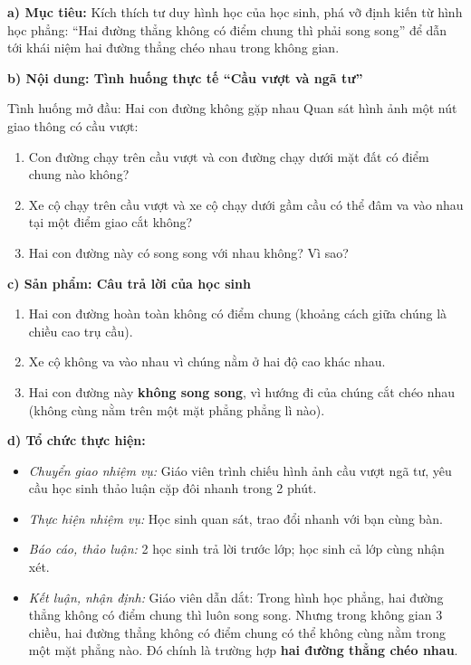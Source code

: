\documentclass[12pt, a4paper]{article}
\begin{document}
\noindent \textbf{a) Mục tiêu:}
Kích thích tư duy hình học của học sinh, phá vỡ định kiến từ hình học phẳng: ``Hai đường thẳng không có điểm chung thì phải song song'' để dẫn tới khái niệm hai đường thẳng chéo nhau trong không gian.

\noindent \textbf{b) Nội dung: Tình huống thực tế ``Cầu vượt và ngã tư''}
\begin{pedabox}{Tình huống mở đầu: Hai con đường không gặp nhau}
Quan sát hình ảnh một nút giao thông có cầu vượt:
\begin{enumerate}[leftmargin=0.6cm]
    \item Con đường chạy trên cầu vượt và con đường chạy dưới mặt đất có điểm chung nào không?
    \item Xe cộ chạy trên cầu vượt và xe cộ chạy dưới gầm cầu có thể đâm va vào nhau tại một điểm giao cắt không?
    \item Hai con đường này có song song với nhau không? Vì sao?
\end{enumerate}
\end{pedabox}

\noindent \textbf{c) Sản phẩm: Câu trả lời của học sinh}
\begin{enumerate}[leftmargin=0.6cm]
    \item Hai con đường hoàn toàn không có điểm chung (khoảng cách giữa chúng là chiều cao trụ cầu).
    \item Xe cộ không va vào nhau vì chúng nằm ở hai độ cao khác nhau.
    \item Hai con đường này \textbf{không song song}, vì hướng đi của chúng cắt chéo nhau (không cùng nằm trên một mặt phẳng phẳng lì nào).
\end{enumerate}

\noindent \textbf{d) Tổ chức thực hiện:}
\begin{itemize}[leftmargin=0.8cm]
    \item \textit{Chuyển giao nhiệm vụ:} Giáo viên trình chiếu hình ảnh cầu vượt ngã tư, yêu cầu học sinh thảo luận cặp đôi nhanh trong 2 phút.
    \item \textit{Thực hiện nhiệm vụ:} Học sinh quan sát, trao đổi nhanh với bạn cùng bàn.
    \item \textit{Báo cáo, thảo luận:} 2 học sinh trả lời trước lớp; học sinh cả lớp cùng nhận xét.
    \item \textit{Kết luận, nhận định:} Giáo viên dẫn dắt: Trong hình học phẳng, hai đường thẳng không có điểm chung thì luôn song song. Nhưng trong không gian 3 chiều, hai đường thẳng không có điểm chung có thể không cùng nằm trong một mặt phẳng nào. Đó chính là trường hợp \textbf{hai đường thẳng chéo nhau}.
\end{itemize}
\end{document}
